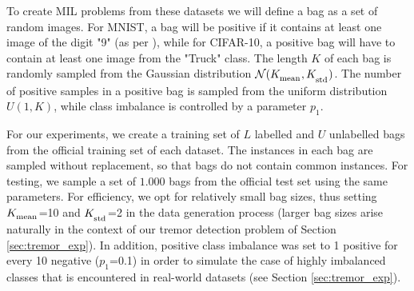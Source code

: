 \documentclass[journal,twoside,web]{ieeecolor}
\begin{document}
To create MIL problems from these datasets we will define a bag as a set of
random images. For MNIST, a bag will be positive if it  contains at least one
image of the digit "9" (as per \cite{pmlr-v80-ilse18a}), while for CIFAR-10, a
positive bag will have to contain at least one image from the "Truck" class. The
length $K$ of each bag is randomly sampled from the Gaussian distribution
$\mathcal{N}(K_\textsubscript{mean}, K_\textsubscript{std})$.  The number of
positive samples in a positive bag is sampled from the uniform
distribution $U(1, K)$, while class imbalance is controlled by a parameter
$p_1$. 

For our experiments, we create a training set of $L$ labelled and $U$ unlabelled
bags from the official training set of each dataset. The instances in each bag
are sampled without replacement, so that bags do not contain common instances.
For testing, we sample a set of $1.000$ bags from the official test set using
the same parameters. For efficiency, we opt for relatively small bag sizes, thus
setting $K_\textsubscript{mean}$=10 and $K_\textsubscript{std}$=2 in the data
generation process (larger bag sizes arise naturally in the context of our
tremor detection problem of Section \ref{sec:tremor_exp}). In addition, positive
class imbalance was set to 1 positive for every 10 negative ($p_1$=0.1)  in
order to simulate the case of highly imbalanced classes that is encountered in
real-world datasets (see Section \ref{sec:tremor_exp}). 
\end{document}
